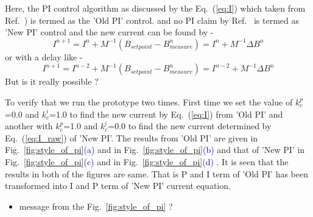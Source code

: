 Here, the PI control algorithm as discussed by the Eq.~(\ref{eq:I}) which taken from Ref.~\cite{bea}) is termed as the 'Old PI' control. and no PI claim by Ref.~\cite{rawlik} is termed as 'New PI' control and the new current can be found by -
\begin{equation}\label{eq:I_raw}
    I^{n+1}= I^n+M^{-1} (B_{setpoint}-B_{measure}^n)=I^n+M^{-1} \Delta B^n
\end{equation}
or with a delay like -
\begin{equation}\label{eq:I_raw_delay}
    I^{n+1}= I^{n-2}+M^{-1} (B_{setpoint}-B_{measure}^n)=I^{n-2}+M^{-1} \Delta B^n
\end{equation}
But is it really possible ? 

To verify that we run the prototype two times. First time we set the value of $k_c^p$=0.0 and $k_c^i$=1.0 to find the new current by Eq.~(\ref{eq:I}) from 'Old PI' and another with $k_c^p$=1.0 and $k_c^i$=0.0 to find the new current determined by Eq.~(\ref{eq:I_raw}) of 'New PI'. The results from 'Old PI' are given in Fig.~\ref{fig:style_of_pi}\textcolor{blue}{(a)} and in Fig.~\ref{fig:style_of_pi}\textcolor{blue}{(b)} and that of 'New PI' in Fig.~\ref{fig:style_of_pi}\textcolor{blue}{(c)} and in Fig.~\ref{fig:style_of_pi}\textcolor{blue}{(d)} . It is seen that the results in both of the figures are same. That is P and I term of 'Old PI' has been transformed into I and P term of 'New PI' current equation.
\begin{itemize}
    \item message from the Fig.~\ref{fig:style_of_pi} ?
\end{itemize}



